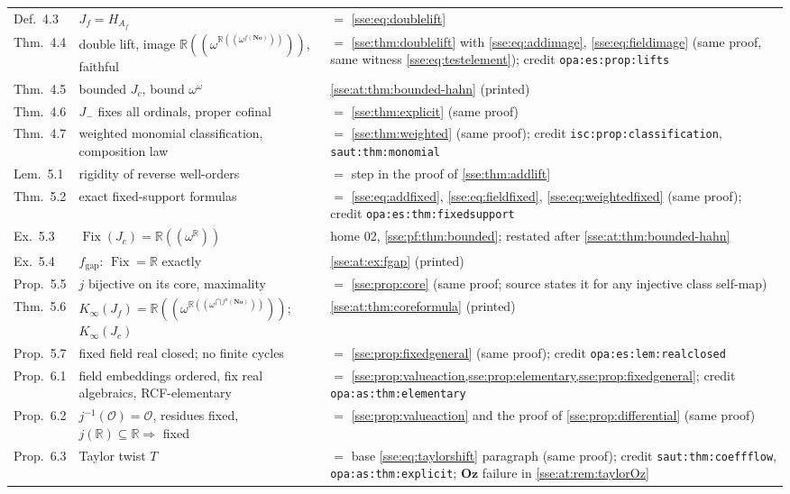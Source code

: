 \documentclass[11pt,a4paper]{article}
\numberwithin{equation}{section}
\theoremstyle{plain}
\theoremstyle{definition}
\theoremstyle{remark}
\newcommand{\No}{\mathbf{No}}
\newcommand{\Oz}{\mathbf{Oz}}
\newcommand{\R}{\mathbb{R}}
\newcommand{\Fix}{\operatorname{Fix}}
\newcommand{\NF}[1]{\R((\omega^{#1}))}
\newcommand{\lbl}[1]{\nolinkurl{#1}}%
\begin{document}
{\begin{longtable}{P{30mm}P{50mm}P{70mm}}
Def.~4.3 & $J_f=H_{A_f}$ & $=$ \eqref{sse:eq:doublelift} \\
Thm.~4.4 & double lift, image $\NF{\NF{f(\No)}}$, faithful & $=$ \cref{sse:thm:doublelift} with \eqref{sse:eq:addimage}, \eqref{sse:eq:fieldimage} (same proof, same witness \eqref{sse:eq:testelement}); credit \lbl{opa:es:prop:lifts} \\
Thm.~4.5 & bounded $J_c$, bound $\omega^\omega$ & \cref{sse:at:thm:bounded-hahn} (printed) \\
Thm.~4.6 & $J_-$ fixes all ordinals, proper cofinal & $=$ \cref{sse:thm:explicit} (same proof) \\
Thm.~4.7 & weighted monomial classification, composition law & $=$ \cref{sse:thm:weighted} (same proof); credit \lbl{isc:prop:classification}, \lbl{saut:thm:monomial} \\
Lem.~5.1 & rigidity of reverse well-orders & $=$ step in the proof of \cref{sse:thm:addlift} \\
Thm.~5.2 & exact fixed-support formulas & $=$ \eqref{sse:eq:addfixed}, \eqref{sse:eq:fieldfixed}, \eqref{sse:eq:weightedfixed} (same proof); credit \lbl{opa:es:thm:fixedsupport} \\
Ex.~5.3 & $\Fix(J_c)=\NF{\R}$ & home 02, \cref{sse:pf:thm:bounded}; restated after \cref{sse:at:thm:bounded-hahn} \\
Ex.~5.4 & $f_{\mathrm{gap}}$: $\Fix=\R$ exactly & \cref{sse:at:ex:fgap} (printed) \\
Prop.~5.5 & $j$ bijective on its core, maximality & $=$ \cref{sse:prop:core} (same proof; source states it for any injective class self-map) \\
Thm.~5.6 & $K_\infty(J_f)=\NF{\NF{\bigcap f^n(\No)}}$; $K_\infty(J_c)$ & \cref{sse:at:thm:coreformula} (printed) \\
Prop.~5.7 & fixed field real closed; no finite cycles & $=$ \cref{sse:prop:fixedgeneral} (same proof); credit \lbl{opa:es:lem:realclosed} \\
Prop.~6.1 & field embeddings ordered, fix real algebraics, RCF-elementary & $=$ \cref{sse:prop:valueaction,sse:prop:elementary,sse:prop:fixedgeneral}; credit \lbl{opa:as:thm:elementary} \\
Prop.~6.2 & $j^{-1}(\mathcal O)=\mathcal O$, residues fixed, $j(\R)\subseteq\R\Rightarrow$ fixed & $=$ \cref{sse:prop:valueaction} and the proof of \cref{sse:prop:differential} (same proof) \\
Prop.~6.3 & Taylor twist $T$ & $=$ base \eqref{sse:eq:taylorshift} paragraph (same proof); credit \lbl{saut:thm:coeffflow}, \lbl{opa:as:thm:explicit}; $\Oz$ failure in \cref{sse:at:rem:taylorOz} \\

\end{longtable}}
\end{document}
